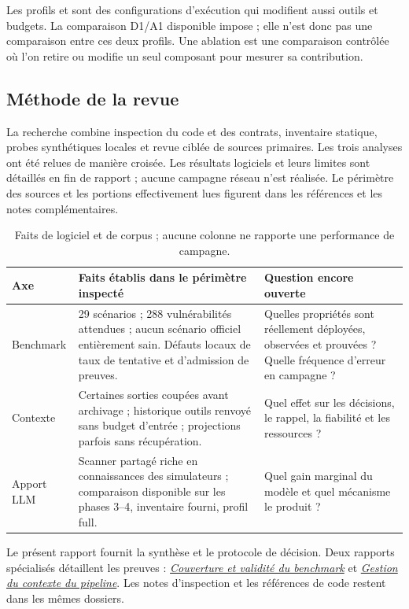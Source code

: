 \documentclass[11pt,a4paper]{article}
\newcommand{\code}[1]{{\small\ttfamily\path{#1}}}
\begin{document}
Les profils \code{full} et \code{compact} sont des configurations d'exécution
qui modifient aussi outils et budgets. La comparaison D1/A1 disponible impose
\code{full} ; elle n'est donc pas une comparaison entre ces deux profils.
Une ablation est une comparaison contrôlée où l'on retire ou modifie un seul
composant pour mesurer sa contribution.

\subsection{Méthode de la revue}
La recherche combine inspection du code et des contrats, inventaire statique,
probes synthétiques locales et revue ciblée de sources primaires. Les trois
analyses ont été relues de manière croisée. Les résultats logiciels et leurs
limites sont détaillés en fin de rapport ; aucune campagne réseau n'est réalisée.
Le périmètre des sources et les portions effectivement lues figurent dans les
références et les notes complémentaires.

\begin{table}[H]\centering\small
\noindent\begin{tabularx}{\linewidth}{@{}>{\raggedright\arraybackslash}p{25mm}YY@{}}\toprule
Axe & Faits établis dans le périmètre inspecté & Question encore ouverte \\\midrule
Benchmark & 29 scénarios ; 288 vulnérabilités attendues ; aucun scénario officiel entièrement sain. Défauts locaux de taux de tentative et d'admission de preuves. & Quelles propriétés sont réellement déployées, observées et prouvées ? Quelle fréquence d'erreur en campagne ? \\
Contexte & Certaines sorties coupées avant archivage ; historique outils renvoyé sans budget d'entrée ; projections parfois sans récupération. & Quel effet sur les décisions, le rappel, la fiabilité et les ressources ? \\
Apport LLM & Scanner partagé riche en connaissances des simulateurs ; comparaison disponible sur les phases 3--4, inventaire fourni, profil full. & Quel gain marginal du modèle et quel mécanisme le produit ? \\\bottomrule
\end{tabularx}
\caption{Faits de logiciel et de corpus ; aucune colonne ne rapporte une performance de campagne.}\label{tab:axes}
\end{table}

Le présent rapport fournit la synthèse et le protocole de décision. Deux
rapports spécialisés détaillent les preuves :
\href{../2026-09-29-benchmark-coverage/report.pdf}{\emph{Couverture et validité du benchmark}}
et \href{../2026-09-29-context-scalability/report.pdf}{\emph{Gestion du contexte du pipeline}}.
Les notes d'inspection et les références de code restent dans les mêmes dossiers.
\end{document}
